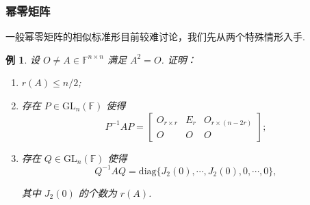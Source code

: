 \documentclass[10pt,openany]{article}
\theoremstyle{thmstyle} %
\theoremstyle{defstyle} %
\theoremstyle{prostyle} %
\theoremstyle{exastyle}
\newtheorem{example}[theorem]{例}
\theoremstyle{remstyle}
\newcommand{\F}{\mathbb{F}}
\newcommand{\gfn}{\text{GL}_n(\mathbb{F})}
\newcommand{\n}{^{n \times n}}
\newcommand{\diag}{\mathrm{diag}}
\begin{document}
\subsubsection{幂零矩阵}

一般幂零矩阵的相似标准形目前较难讨论，我们先从两个特殊情形入手.

\begin{example}
	设 \( O \neq A \in \F\n \) 满足 \( A^2=O \). 证明：
	\begin{enumerate}[(1)]
		\item \( r(A) \leq n/2 \);
		\item 存在 \( P \in \gfn \) 使得
		\[ P^{-1}AP=\begin{bmatrix}
			O_{r \times r} & E_r & O_{r \times (n-2r)} \\
			O & O & O
		\end{bmatrix}; \]
		\item 存在 \( Q \in \gfn \) 使得
		\[ Q^{-1}AQ= \diag\{J_2(0),\cdots,J_2(0),0,\cdots,0\}, \]
		
		其中 \( J_2(0) \) 的个数为 \( r(A) \).
	\end{enumerate}
\end{example}
\end{document}

